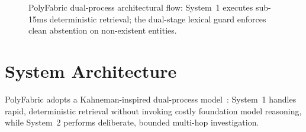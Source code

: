 \documentclass[10pt,journal,compsoc]{IEEEtran}
\begin{document}
\begin{figure}[!t]
\centering
{}
\caption{PolyFabric dual-process architectural flow: System~1 executes sub-15ms deterministic retrieval; the dual-stage lexical guard enforces clean abstention on non-existent entities.}
\label{fig:arch}
\end{figure}

\section{System Architecture}

PolyFabric adopts a Kahneman-inspired dual-process model~\cite{kahneman2011thinking}: System~1 handles rapid, deterministic retrieval without invoking costly foundation model reasoning, while System~2 performs deliberate, bounded multi-hop investigation.
\end{document}
